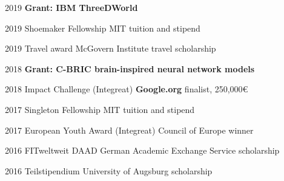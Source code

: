 {%

\block%
{%
2019  %
}{%
}{%
}{%
\textbf{Grant: IBM ThreeDWorld}
}{%
}{%
}

\award%
{%
2019
}{%
Shoemaker Fellowship  %
}{%
MIT
}{%
tuition and stipend
}

\award%
{%
2019
}{%
Travel award
}{%
McGovern Institute %
}{%
travel scholarship
}

\block%
{%
2018
}{%
}{%
}{%
\textbf{Grant: C-BRIC brain-inspired neural network models}
}{%
}{%
}

\award%
{%
2018
}{%
Impact Challenge (Integreat)
}{%
\textbf{Google.org}
}{%
finalist, 250,000\euro{}
}

\award%
{%
2017
}{%
Singleton Fellowship  %
}{%
MIT
}{%
tuition and stipend  %
}

\award%
{%
2017
}{%
European Youth Award (Integreat)
}{%
Council of Europe
}{%
winner
}


\award%
{%
2016
}{%
FITweltweit
}{%
DAAD German Academic Exchange Service
}{%
scholarship %
}

\award%
{%
2016
}{%
Teilstipendium
}{%
University of Augsburg
}{%
scholarship
}

}
